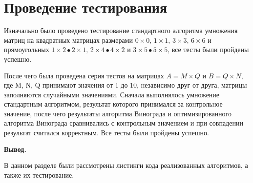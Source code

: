 \section{Проведение тестирования}
\label{sec:tests}
Изначально было проведено тестирование стандартного алгоритма умножения матриц на квадратных матрицах размерами $0\times0,\,1\times1,\,3\times3,\,6\times6$ и прямоугольных $1\times2\bullet 2\times1,\,2\times4\bullet4\times2$ и $3\times5\bullet5\times5$, все тесты были пройдены успешно.
\par После чего была проведена серия тестов на матрицах $A=M\times Q$ и $B=Q\times N$, где M, N, Q принимают значения от 1 до 10, независимо друг от друга, матрицы заполняются случайными значениями. Сначала выполнялось умножение стандартным алгоритмом, результат которого принимался за контрольное значение, после чего результаты алгоритма Винограда и оптимизированного алгоритма Винограда сравнивались с контрольным значением и при совпадении результат считался корректным. Все тесты были пройдены успешно.

\par\textbf{Вывод.}
\par В данном разделе были рассмотрены листинги кода реализованных алгоритмов, а также их тестирование.
